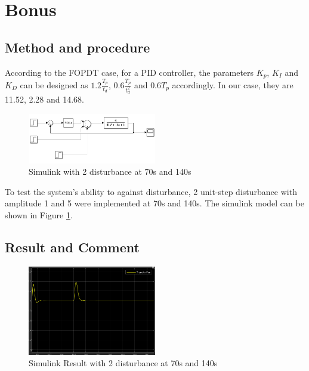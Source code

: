 \documentclass[11pt, a4paper]{article}
\begin{document}
\section{Bonus}

\subsection{Method and procedure}

According to the FOPDT case, for a PID controller, the parameters $K_{p}$, $K_{I}$ and $K_{D}$ can be designed as $1.2\frac{T_{p}}{t_{d}}$, $0.6\frac{T_{p}}{t_{d}^2}$ and $0.6T_{p}$ accordingly. In our case, they are 11.52, 2.28 and 14.68.

\begin{figure}[htbp]     \begin{centering}
    \includegraphics[width=0.5\textwidth]{5.png}
    \caption{\label{Fig:p5}Simulink with 2 disturbance at 70s and 140s}
    \end{centering}
    
\end{figure}

To test the system's ability to against disturbance, 2 unit-step disturbance with amplitude 1 and 5 were implemented at 70s and 140s. The simulink model can be shown in Figure \ref{Fig:p5}.
\newpage

\subsection{Result and Comment}

\begin{figure}[htbp]     \begin{centering}
    \includegraphics[width=0.5\textwidth]{5_r.png}
    \caption{\label{Fig:p5_r}Simulink Result with 2 disturbance at 70s and 140s}
    \end{centering}
   
\end{figure}
\end{document}

